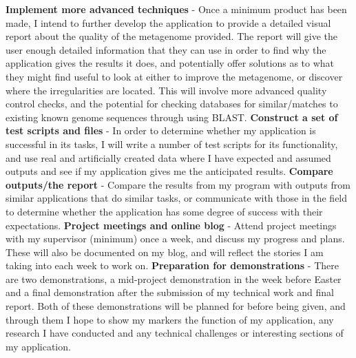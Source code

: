 \documentclass[11pt,fleqn,twoside]{article}
\begin{document}
\newline
\noindent
\textbf{Implement more advanced techniques} - Once a minimum product has been made, I intend to further develop the application to provide a detailed visual report about the quality of the metagenome provided. The report will give the user enough detailed information that they can use in order to find why the application gives the results it does, and potentially offer solutions as to what they might find useful to look at either to improve the metagenome, or discover where the irregularities are located. This will involve more advanced quality control checks, and the potential for checking databases for similar/matches to existing known genome sequences through using BLAST\cite{blast}.
\newline
\noindent
\textbf{Construct a set of test scripts and files} - In order to determine whether my application is successful in its tasks, I will write a number of test scripts for its functionality, and use real and artificially created data where I have expected and assumed outputs and see if my application gives me the anticipated results.
\newline
\noindent
\textbf{Compare outputs/the report} - Compare the results from my program with outputs from similar applications that do similar tasks, or communicate with those in the field to determine whether the application has some degree of success with their expectations.
\newline
\noindent
\textbf{Project meetings and online blog} - Attend project meetings with my supervisor (minimum) once a week, and discuss my progress and plans. These will also be documented on my blog, and will reflect the stories I am taking into each week to work on.
\newline
\noindent
\textbf{Preparation for demonstrations} - There are two demonstrations, a mid-project demonstration in the week before Easter and a final demonstration after the submission of my technical work and final report. Both of these demonstrations will be planned for before being given, and through them I hope to show my markers the function of my application, any research I have conducted and any technical challenges or interesting sections of my application. 

\end{document}

